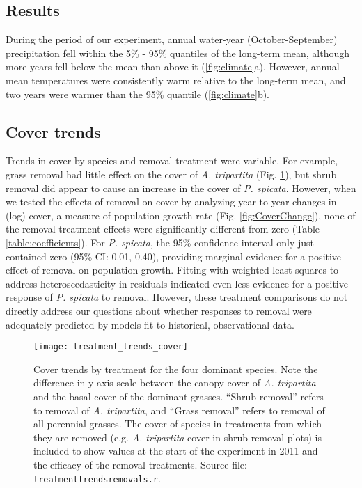 \documentclass[11pt]{article}
\begin{document}
\begin{doublespacing}
\section*{Results}

During the period of our experiment, annual water-year (October-September) precipitation fell within the 5\% - 95\% quantiles of the long-term mean, although more years fell below the mean than above it (\ref{fig:climate}a). However, annual mean temperatures were consistently warm relative to the long-term mean, and two years were warmer than the 95\% quantile (\ref{fig:climate}b).  

\subsection*{Cover trends}

Trends in cover by species and removal treatment were variable. For example, grass removal had little effect on the cover of \textit{A. tripartita} 
(Fig. \ref{fig:CoverTrends}), but shrub removal did appear to cause an increase in the cover of \textit{P. spicata}. 
However, when we tested the effects of removal on cover by analyzing year-to-year changes in (log) cover, a measure of population growth rate (Fig. \ref{fig:CoverChange}), none of the removal treatment effects were significantly different from zero (Table \ref{table:coefficients}). For \textit{P. spicata}, the 95\% confidence interval only just contained zero (95\% CI: 0.01, 0.40), providing marginal evidence for a positive effect of removal on population growth. Fitting with weighted least squares to address heteroscedasticity in residuals indicated even less evidence for a positive response of  \textit{P. spicata} to removal. However, these treatment comparisons do not directly address our questions about whether responses to removal were 
adequately predicted by models fit to historical, observational data. 

\begin{figure}[tbp]
\centering
\texttt{[image: treatment\_trends\_cover]}
\caption{Cover trends by treatment for the four dominant species.  Note the difference in y-axis scale between the canopy cover of \textit{A. tripartita} and the basal cover of the dominant grasses. ``Shrub removal'' refers to removal of \textit{A. tripartita}, and ``Grass removal'' refers to removal of all perennial grasses. The cover of species in treatments from which they are removed (e.g. \textit{A. tripartita} cover in shrub removal plots) is included to show values at the start of the experiment in 2011 and the efficacy of the removal treatments. Source file: \texttt{treatment\textunderscore trends\textunderscore removals.r}.}
\label{fig:CoverTrends}
\end{figure}



\end{doublespacing}
\end{document}
